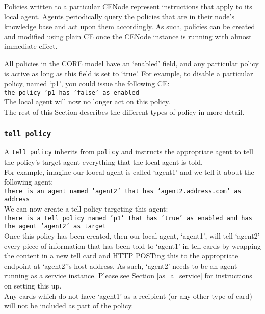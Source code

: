 \documentclass{scrartcl}
\begin{document}
Policies written to a particular CENode represent instructions that apply to its local agent. Agents periodically query the policies that are in their node's knowledge base and act upon them accordingly. As such, policies can be created and modified using plain CE once the CENode instance is running with almost immediate effect.

All policies in the CORE model have an `enabled' field, and any particular policy is active as long as this field is set to `true'. For example, to disable a particular policy, named `p1', you could issue the following CE:\\
\texttt{the policy 'p1 has 'false' as enabled}\\
The local agent will now no longer act on this policy.\\

The rest of this Section describes the different types of policy in more detail.

\subsubsection{\texttt{tell policy}}
A \texttt{tell policy} inherits from \texttt{policy} and instructs the appropriate agent to tell the policy's target agent everything that the local agent is told.\\

For example, imagine our loocal agent is called `agent1' and we tell it about the following agent:\\
\texttt{there is an agent named 'agent2' that has 'agent2.address.com' as address}\\
We can now create a tell policy targeting this agent:\\
\texttt{there is a tell policy named 'p1' that has 'true' as enabled and has the agent 'agent2' as target}\\

Once this policy has been created, then our local agent, `agent1', will tell `agent2' every piece of information that has been told to `agent1' in tell cards by wrapping the content in a new tell card and HTTP POSTing this to the appropriate endpoint at `agent2''s host address. As such, `agent2' needs to be an agent running as a service instance. Please see Section \ref{as_a_service} for instructions on setting this up.\\

Any cards which do not have `agent1' as a recipient (or any other type of card) will not be included as part of the policy.
\end{document}
